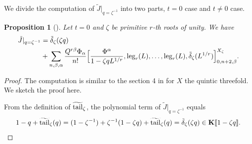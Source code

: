 \documentclass[11pt]{amsart}
\newtheorem{proposition}[theorem]{Proposition}
\newtheorem*{main theorem*}{Main Theorem}
\theoremstyle{remark}
\numberwithin{equation}{section}
\newcommand{\leg}{{\rm leg}}
\newcommand{\tail}{{\rm tail}}
\begin{document}
We divide the computation of $\tilde{J}|_{q=\zeta^{-1}}$ into two parts, $t=0$ case and $t\neq 0$ case.
\begin{proposition}[{\cite[\S~4]{Chou_Lee_2022_QKGVI}}]  \label{prop:Jzeta_t=0}  Let $t=0$ and $\zeta$ be primitive $r$-th roots of unity. We have
\[
\begin{split}
    \tilde{J}|_{q=\zeta^{-1}} &= \tilde{\delta}_{\zeta}(\zeta q)
    \\
    &+ \sum_{n,\beta,\alpha} \frac{Q^{r\beta} \Phi_{\alpha}}{n!} \Big[ \frac{\Phi^{\alpha}}{1-\zeta q L^{1/r}}, \leg_{r}(L) ,\dots, \leg_{r}(L), \tilde{\delta}_{\zeta}(L^{1/r}) \Big]^{X_{\zeta}}_{0,n+2,\beta}.
\end{split}
\]
\end{proposition}
\begin{proof}
The computation is similar to the section 4 in \cite{Chou_Lee_2022_QKGVI} for $X$ the quintic threefold. We sketch the proof here.

From the definition of $\widetilde{\tail}_{\zeta}$, the polynomial term of $\tilde{J}|_{q=\zeta^{-1}}$ equals 
\[
1-q + \widetilde{\tail}_{\zeta}(q) = (1-\zeta^{-1}) + \zeta^{-1}(1-\zeta q) +\widetilde{\tail}_{\zeta}(q)  = \tilde{\delta}_{\zeta}(\zeta q) \in \mathbf{K}[\![1-\zeta q]\!].
\] 


\end{proof}
\end{document}

